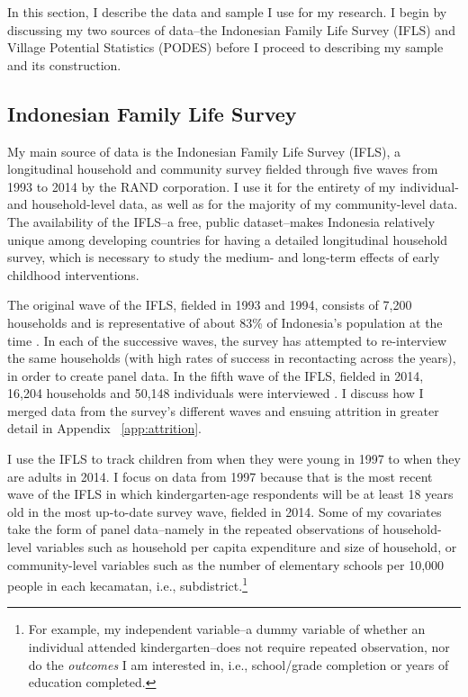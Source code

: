 \def \data #1{/Users/danielposthumus/thesis_independent_study/work/writing/rough_draft/data/#1}

In this section, I describe the data and sample I use for my research. I begin by discussing my two sources of data--the Indonesian Family Life Survey (IFLS) and Village Potential Statistics (PODES) before I proceed to describing my sample and its construction.

\subsection{Indonesian Family Life Survey}
	\label{sec:ifls}
My main source of data is the Indonesian Family Life Survey (IFLS), a longitudinal household and community survey fielded through five waves from 1993 to 2014 by the RAND corporation. I use it for the entirety of my individual- and household-level data, as well as for the majority of my community-level data. The availability of the IFLS--a free, public dataset--makes Indonesia relatively unique among developing countries for having a detailed longitudinal household survey, which is necessary to study the medium- and long-term effects of early childhood interventions.

The original wave of the IFLS, fielded in 1993 and 1994, consists of 7,200 households and is representative of about 83\% of Indonesia's population at the time \citep{Serrato1995}. In each of the successive waves, the survey has attempted to re-interview the same households (with high rates of success in recontacting across the years), in order to create panel data. In the fifth wave of the IFLS, fielded in 2014, 16,204 households and 50,148 individuals were interviewed \citep{Strauss2016}. I discuss how I merged data from the survey's different waves and ensuing attrition in greater detail in Appendix ~\ref{app:attrition}.

I use the IFLS to track children from when they were young in 1997 to when they are adults in 2014. I focus on data from 1997 because that is the most recent wave of the IFLS in which kindergarten-age respondents will be at least 18 years old in the most up-to-date survey wave, fielded in 2014. Some of my covariates take the form of panel data--namely in the repeated observations of household-level variables such as household per capita expenditure and  size of household, or community-level variables such as the number of elementary schools per 10,000 people in each kecamatan, i.e., subdistrict.\footnote{For example, my independent variable--a dummy variable of whether an individual attended kindergarten--does not require repeated observation, nor do the \textit{outcomes} I am interested in, i.e., school/grade completion or years of education completed.}

